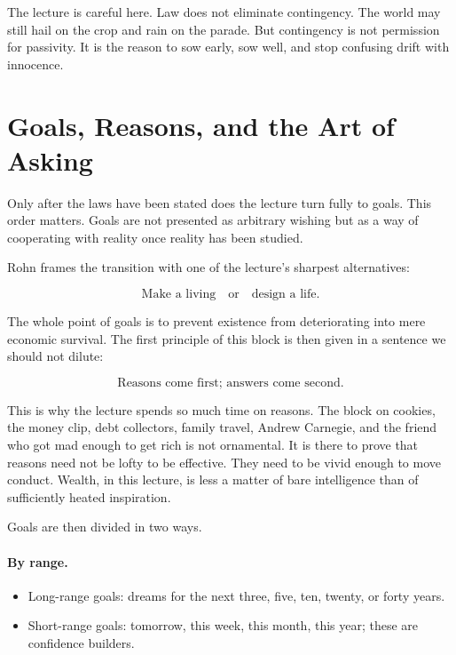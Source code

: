 The lecture is careful here. Law does not eliminate contingency. The world may still hail on the crop and rain on the parade. But contingency is not permission for passivity. It is the reason to sow early, sow well, and stop confusing drift with innocence.

\section{Goals, Reasons, and the Art of Asking}

Only after the laws have been stated does the lecture turn fully to goals. This order matters. Goals are not presented as arbitrary wishing but as a way of cooperating with reality once reality has been studied.

Rohn frames the transition with one of the lecture's sharpest alternatives:

\begin{equation}
\text{Make a living} \quad \text{or} \quad \text{design a life.}
\end{equation}

The whole point of goals is to prevent existence from deteriorating into mere economic survival. The first principle of this block is then given in a sentence we should not dilute:

\begin{equation}
\text{Reasons come first; answers come second.}
\end{equation}

This is why the lecture spends so much time on reasons. The block on cookies, the money clip, debt collectors, family travel, Andrew Carnegie, and the friend who got mad enough to get rich is not ornamental. It is there to prove that reasons need not be lofty to be effective. They need to be vivid enough to move conduct. Wealth, in this lecture, is less a matter of bare intelligence than of sufficiently heated inspiration.

Goals are then divided in two ways.

\paragraph{By range.}
\begin{itemize}
\item Long-range goals: dreams for the next three, five, ten, twenty, or forty years.
\item Short-range goals: tomorrow, this week, this month, this year; these are confidence builders.
\end{itemize}

